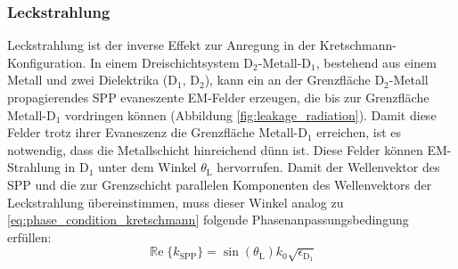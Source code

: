 \documentclass[titlepage,  ngerman]{article}
\renewcommand{\Re}{\operatorname{\mathbb{R}e}}
\begin{document}
	\subsubsection{Leckstrahlung}
	\label{sec:leakage_radiation}
	Leckstrahlung ist der inverse Effekt zur Anregung in der Kretschmann-Konfiguration. In einem Dreischichtsystem $\mathrm{D}_2$-Metall-$\mathrm{D}_1$, bestehend aus einem Metall und zwei Dielektrika ($\mathrm{D}_1$, $\mathrm{D}_2$), kann ein an der Grenzfläche $\mathrm{D}_2$-Metall propagierendes SPP evaneszente EM-Felder erzeugen, die bis zur Grenzfläche Metall-$\mathrm{D}_1$ vordringen können (Abbildung \ref{fig:leakage_radiation}). Damit diese Felder trotz ihrer Evaneszenz die Grenzfläche Metall-$\mathrm{D}_1$ erreichen, ist es notwendig, dass die Metallschicht hinreichend dünn ist. Diese Felder können EM-Strahlung in $\mathrm{D}_1$ unter dem Winkel $\theta_\mathrm{L}$ hervorrufen. Damit der Wellenvektor des SPP und die zur Grenzschicht parallelen Komponenten des Wellenvektors der Leckstrahlung übereinstimmen, muss dieser Winkel analog zu \eqref{eq:phase_condition_kretschmann} folgende Phasenanpassungsbedingung erfüllen:
	\begin{equation}
		\label{eq:phase_condition}
		\boxed{\Re\{k_{\mathrm{SPP}}\}=\sin(\theta_\mathrm{L}) k_0 \sqrt{\epsilon_{\mathrm{D}_1}}}
	\end{equation}
	
\end{document}
